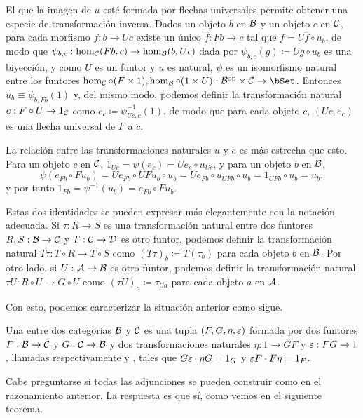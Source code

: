 El que la imagen de $u$ esté formada por flechas universales permite obtener una
especie de transformación inversa. Dados un objeto $b$ en $\mathcal{B}$ y un objeto $c$
en $\mathcal{C}$, para cada morfismo $f:b\to Uc$ existe un único $\hat f:Fb\to c$ tal
que $f=U\hat f\circ u_b$, de modo que
$\psi_{b,c}:\hom_{\mathcal{C}}(Fb,c)\to\hom_{\mathcal{B}}(b,Uc)$ dada por
$\psi_{b,c}(g)\coloneqq Ug\circ u_b$ es una biyección, y como $U$ es un funtor y
$u$ es natural, $\psi$ es un isomorfismo natural entre los funtores
$\hom_\cC\circ(F\times 1),\hom_\cB\circ(1\times
U):\dual{\cB}\times\cC\to\bSet$. Entonces $u_b\equiv\psi_{b,Fb}(1)$ y, del mismo
modo, podemos definir la transformación natural $e:F\circ U\to 1_{\mathcal{C}}$ como
$e_c\coloneqq\psi_{Uc,c}^{-1}(1)$, de modo que para cada objeto $c$, $(Uc,e_c)$
es una flecha universal de $F$ a $c$.

La relación entre las transformaciones naturales $u$ y $e$ es más estrecha que
esto. Para un objeto $c$ en $\mathcal{C}$, $1_{Uc}=\psi(e_c)=Ue_c\circ u_{Uc}$, y para
un objeto $b$ en $\mathcal{B}$,
\[
  \psi(e_{Fb}\circ Fu_b) = Ue_{Fb}\circ UFu_b\circ u_b
  = Ue_{Fb}\circ u_{UFb}\circ u_b = 1_{UFb}\circ u_b = u_b,
\]
y por tanto $1_{Fb} = \psi^{-1}(u_b) = e_{Fb}\circ Fu_b$.

Estas dos identidades se pueden expresar más elegantemente con la notación
adecuada. Si $\tau:R\to S$ es una transformación natural entre dos funtores
$R,S:\mathcal{B}\to\mathcal{C}$ y $T:\mathcal{C}\to\mathcal{D}$ es otro funtor, podemos definir la
transformación natural $T\tau:T\circ R\to T\circ S$ como
$(T\tau)_b\coloneqq T(\tau_b)$ para cada objeto $b$ en $\mathcal{B}$. Por otro lado, si
$U:\mathcal{A}\to\mathcal{B}$ es otro funtor, podemos definir la transformación natural
$\tau U:R\circ U\to G\circ U$ como $(\tau U)_a\coloneqq\tau_{Ua}$ para cada
objeto $a$ en $\mathcal{A}$.

Con esto, podemos caracterizar la situación anterior como sigue.

\begin{definition}
  Una  entre dos categorías $\mathcal{B}$ y $\mathcal{C}$ es una tupla
  $(F,G,\eta,\varepsilon)$ formada por dos funtores $F:\mathcal{B}\to\mathcal{C}$ y $G:\mathcal{C}\to\mathcal{B}$ y dos
  transformaciones naturales $\eta:1\to GF$ y $\varepsilon:FG\to 1$, llamadas
  respectivamente  y , tales que
  $G\varepsilon\cdot\eta G=1_G$ y $\varepsilon F\cdot F\eta=1_F$.
\end{definition}

Cabe preguntarse si todas las adjunciones se pueden construir como en el
razonamiento anterior. La respuesta es que sí, como vemos en el siguiente
teorema.

